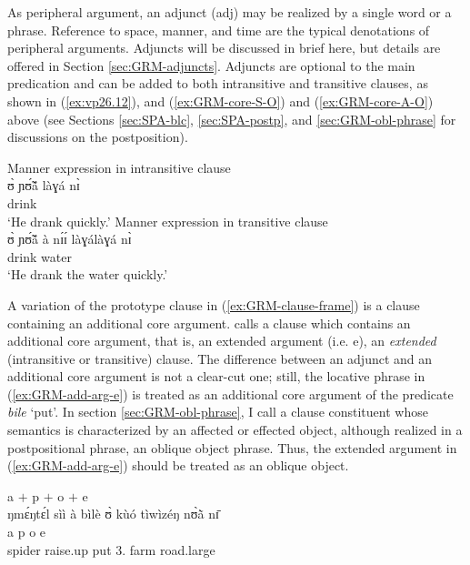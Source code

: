 As
peripheral argument,  an  adjunct  ({\sc adj}) may be realized by a single word
or a phrase. Reference to space, manner, and time are the
typical  denotations of peripheral arguments.  Adjuncts will be discussed in 
brief here, but details are offered in Section 
\ref{sec:GRM-adjuncts}.  Adjuncts are optional to the main
predication and can be added to both intransitive and transitive clauses, as 
shown in  (\ref{ex:vp26.12}), and (\ref{ex:GRM-core-S-O}) and 
(\ref{ex:GRM-core-A-O}) above (see Sections \ref{sec:SPA-blc}, 
\ref{sec:SPA-postp},  and \ref{sec:GRM-obl-phrase} for  discussions on the 
postposition).

\ea

\ea\label{ex:vp26.12}{\rm Manner expression  in intransitive clause}\\
\gll ʊ̀ ɲʊ̃́ã́ làɣá nɪ̀   \\
      {\psg} drink {\ideo} {\postp}    \\
\glt  `He drank quickly.' 
% 
\ex\label{ex:vp26.13.}{\rm  Manner expression in transitive clause}\\
\gll ʊ̀ ɲʊ̃́ã́ à nɪ́ɪ́  làɣálàɣá nɪ̀ \\
      {\psg} drink {\art} water  {\ideo} {\postp}     \\
\glt  `He drank the water quickly.' 

\z 
 \z



A variation of the prototype  clause in (\ref{ex:GRM-clause-frame}) is a
clause containing an additional core argument.  \citet[116]{Dixo10b} calls  a
clause which contains an
additional core argument, that is,  an extended argument (i.e. {\sc e}), an
{\it extended} (intransitive or transitive) clause. The
difference between an adjunct and an additional core argument is not a clear-cut
one;   still,   the locative phrase in (\ref{ex:GRM-add-arg-e}) is treated as
  an additional core argument of the predicate {\it bile} `put'. In section
\ref{sec:GRM-obl-phrase}, I call a clause constituent whose semantics is
characterized by an  affected or effected object, although realized in a
postpositional phrase, an oblique object phrase. Thus, the extended argument
in (\ref{ex:GRM-add-arg-e}) should be treated as an oblique object. 


\ea\label{ex:GRM-add-arg-e}{{\sc a} $+$ {\sc p}  $+$  {\sc o} $+$   {\sc e}}\\
\glll ŋmɛ́ŋtɛ́l {sìì    à    bìlè}  {ʊ̀  kùó}  {tìwìzéŋ nʊ̀ã̀  nɪ̄}\\
{\sc a} {\sc p}   {\sc o}   {\sc e}\\
spider    {raise.up   {\conn}    put}    {{3\sg.\poss}   farm } 
{road.large     {\reln}  {\postp}}\\

